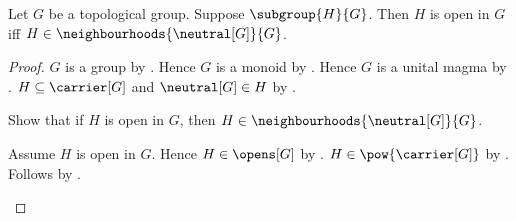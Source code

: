 \begin{theorem}\label{subgroup_open_iff_neighbourhood_of_neutral}
    Let $G$ be a topological group.
    Suppose $\subgroup{H}{G}$.
    Then $H$ is open in $G$ iff
        $H\in\neighbourhoods{\neutral[G]}{G}$.
\end{theorem}
\begin{proof}
    $G$ is a group by .
    Hence $G$ is a monoid by .
    Hence $G$ is a unital magma by .
    $H\subseteq\carrier[G]$ and $\neutral[G]\in H$
        by .

    Show that if $H$ is open in $G$, then
        $H\in\neighbourhoods{\neutral[G]}{G}$.
    \begin{subproof}
        Assume $H$ is open in $G$.
        Hence $H\in\opens[G]$ by .
        $H\in\pow{\carrier[G]}$ by .
        Follows by .
    \end{subproof}


\end{proof}
